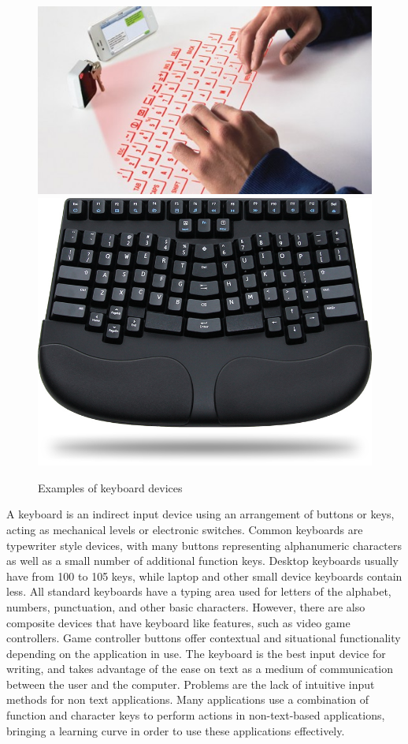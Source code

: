 \documentclass[11pt]{report}
\begin{document}
\begin{figure}
\includegraphics[width=\textwidth]{virtual-keyboard}
\includegraphics[width=\textwidth]{ergonomickeyboard}
\caption{Examples of keyboard devices}
\end{figure}

A keyboard is an indirect input device using an arrangement of buttons or keys, acting as mechanical levels or electronic switches. 
Common keyboards are typewriter style devices, with many buttons representing alphanumeric characters as well as a small number of additional function keys.
Desktop keyboards usually have from 100 to 105 keys, while laptop and other small device keyboards contain less.
All standard keyboards have a typing area used for letters of the alphabet, numbers, punctuation, and other basic characters.
However, there are also composite devices that have keyboard like features, such as video game controllers. 
Game controller buttons offer contextual and situational functionality depending on the application in use.
The keyboard is the best input device for writing, and takes advantage of the ease on text as a medium of communication between the user and the computer.
Problems are the lack of intuitive input methods for non text applications.
Many applications use a combination of function and character keys to perform actions in non-text-based applications, bringing a learning curve in order to use these applications effectively.
\end{document}
